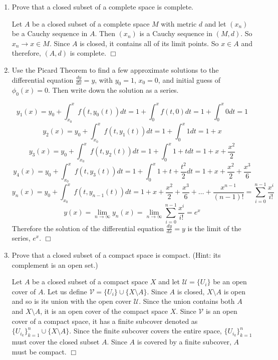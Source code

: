 \documentclass[12pt,letterpaper,reqno]{amsart}
\begin{document}
\begin{enumerate}[1.]
\begin{flushleft}
\end{flushleft}
\vspace{.15in}
\item Prove that a closed subset of a complete space is complete.
\vspace{.15in}
\begin{flushleft}
Let $A$ be a closed subset of a complete space $M$ with metric $d$ and let $(x_n)$ be a Cauchy sequence in $A$. Then $(x_n)$ is a Cauchy sequence in $(M,d)$. So $x_n\rightarrow x \in M$. Since $A$ is closed, it contains all of its limit points. So $x \in A$ and therefore, $(A,d)$ is complete. $\Box$\newline
\end{flushleft}
\item Use the Picard Theorem to find a few approximate solutions to the differential equation $\frac{dy}{dx}=y$, with $y_0=1$, $x_0=0$, and initial guess of $\phi_0(x)=0$. Then write down the solution as a series.
\begin{flushleft}
$$y_1(x) = y_{0} + \int_{x_{0}}^{x} f(t, y_0(t)) dt = 1 + \int_0^{x} f(t, 0) dt = 1 + \int_0^{x} 0 dt = 1$$
$$y_2(x) = y_{0} + \int_{x_{0}}^{x} f(t, y_1(t)) dt = 1 + \int_0^{x} 1 dt = 1 + x$$
$$y_3(x) = y_{0} + \int_{x_{0}}^{x} f(t, y_2(t)) dt = 1 + \int_0^{x} 1 + t dt = 1 + x + \frac{x^2}{2}$$
$$y_4(x) = y_{0} + \int_{x_{0}}^{x} f(t, y_3(t)) dt = 1 + \int_0^{x} 1 + t + \frac{t^2}{2} dt = 1 + x + \frac{x^2}{2} + \frac{x^3}{6}$$
$$y_n(x) = y_{0} + \int_{x_{0}}^{x} f(t, y_{n-1}(t)) dt = 1 + x + \frac{x^2}{2} + \frac{x^3}{6} + \ldots + \frac{x^{n-1}}{(n-1)!} = \sum\limits_{i=0}^{n-1} \frac{x^i}{i!}$$
$$y(x) = \lim_{n\rightarrow\infty}y_n(x) = \lim_{n\rightarrow\infty}\sum\limits_{i=0}^{n-1} \frac{x^i}{i!} = e^x$$
Therefore the solution of the differential equation $\frac{dy}{dx}=y$ is the limit of the series, $e^x$. $\Box$
\newline
\end{flushleft}
\item Prove that a closed subset of a compact space is compact. (Hint: its complement is an open set.)
\vspace{.15in}
\begin{flushleft}
Let $A$ be a closed subset of a compact space $X$ and let $\mathcal{U} = \{U_i\}$ be an open cover of $A$. Let us define $\mathcal{V} = \{U_i\} \cup \{X\setminus A\}$. Since $A$ is closed, $X\setminus A$ is open and so is its union with the open cover $\mathcal{U}$. Since the union contains both $A$ and $X\setminus A$, it is an open cover of the compact space $X$. Since $\mathcal{V}$ is an open cover of a compact space, it has a finite subcover denoted as $\{U_{i_k}\}_{k=1}^n \cup \{X\setminus A\}$. Since the finite subcover covers the entire space, $\{U_{i_k}\}_{k=1}^n$ must cover the closed subset $A$. Since $A$ is covered by a finite subcover, $A$ must be compact. $\Box$\newline

\end{flushleft}
\end{enumerate}
\end{document}
